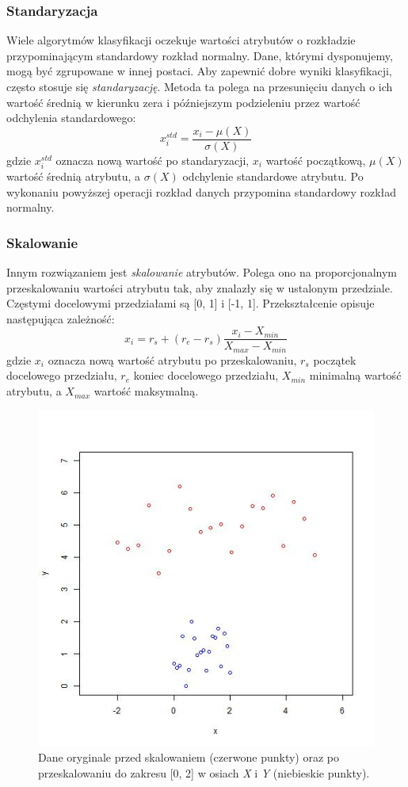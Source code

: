\documentclass[../thesis.tex]{subfiles}
\begin{document}
\subsubsection{Standaryzacja}

Wiele algorytmów klasyfikacji oczekuje wartości atrybutów o rozkładzie przypominającym standardowy rozkład normalny. Dane, którymi dysponujemy, mogą być zgrupowane w innej postaci. Aby zapewnić dobre wyniki klasyfikacji, często stosuje się \emph{standaryzację}. Metoda ta polega na przesunięciu danych o ich wartość średnią w kierunku zera i późniejszym podzieleniu przez wartość odchylenia standardowego:
\[x_i^{std} = \frac{x_i - \mu(X)}{\sigma(X)}\]
gdzie $x_i^{std}$ oznacza nową wartość po standaryzacji, $x_i$ wartość początkową, $\mu(X)$ wartość średnią atrybutu, a $\sigma(X)$ odchylenie standardowe atrybutu. Po wykonaniu powyższej operacji rozkład danych przypomina standardowy rozkład normalny.

\subsubsection{Skalowanie}

Innym rozwiązaniem jest \emph{skalowanie} atrybutów. Polega ono na proporcjonalnym przeskalowaniu wartości atrybutu tak, aby znalazły się w ustalonym przedziale. Częstymi docelowymi przedziałami są [0, 1] i [-1, 1]. Przekształcenie opisuje następująca zależność:
\[x_i = r_s + (r_e - r_s)\frac{x_i - X_{min}}{X_{max} - X_{min}}\]
gdzie $x_i$ oznacza nową wartość atrybutu po przeskalowaniu, $r_s$ początek docelowego przedziału, $r_e$ koniec docelowego przedziału, $X_{min}$ minimalną wartość atrybutu, a $X_{max}$ wartość maksymalną.

\begin{figure}[h]
\centering
\includegraphics[height=.4\textheight]{scale.jpg}
\caption{Dane oryginale przed skalowaniem (czerwone punkty) oraz po przeskalowaniu do zakresu [0, 2] w osiach \emph{X} i \emph{Y} (niebieskie punkty).}
\label{classification:scale}
\end{figure}
\end{document}
